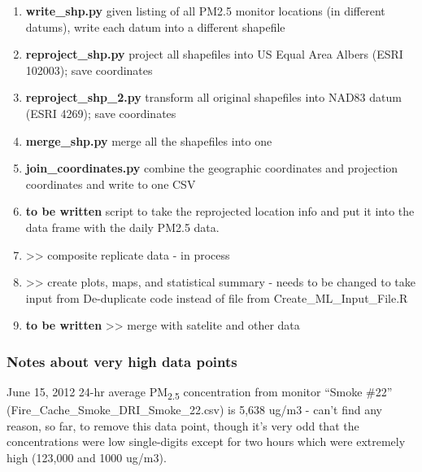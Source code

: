 \begin{enumerate}[nolistsep]
\begin{enumerate}[nolistsep]
	\end{enumerate}

\item \textbf{write_shp.py} given listing of all PM2.5 monitor locations (in different datums), write each datum into a different shapefile
\item \textbf{reproject_shp.py} project all shapefiles into US Equal Area Albers (ESRI 102003); save coordinates
\item \textbf{reproject_shp_2.py} transform all original shapefiles into NAD83 datum (ESRI 4269); save coordinates 
\item \textbf{merge_shp.py} merge all the shapefiles into one
\item \textbf{join_coordinates.py} combine the geographic coordinates and projection coordinates and write to one CSV

\item \textbf{to be written} script to take the reprojected location info and put it into the data frame with the daily PM2.5 data.

\item {} >> composite replicate data - in process
\item {} >> create plots, maps, and statistical summary - needs to be changed to take input from De-duplicate code instead of file from Create\_ML\_Input\_File.R
\item \textbf{to be written} >> merge with satelite and other data
\end{enumerate}

\subsubsection{Notes about very high data points}

June 15, 2012 24-hr average PM\textsubscript{2.5} concentration from monitor ``Smoke \#22'' (Fire\_Cache\_Smoke\_DRI\_Smoke\_22.csv) is 5,638 ug/m3 - can't find any reason, so far, to remove this data point, though it's very odd that the concentrations were low single-digits except for two hours which were extremely high (123,000 and 1000 ug/m3).



